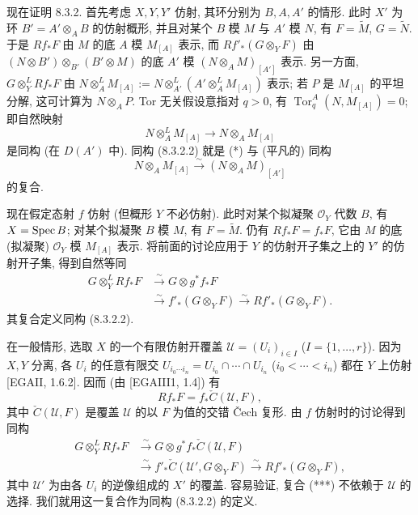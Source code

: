 现在证明 8.3.2. 首先考虑 $X,Y,Y'$ 仿射, 其环分别为 $B,A,A'$ 的情形. 此时 $X'$ 为环 $B'=A'\otimes_AB$ 的仿射概形, 并且对某个 $B$ 模 $M$ 与 $A'$ 模 $N$, 有 $F=\widetilde M$, $G=\widetilde N$. 于是 $Rf_*F$ 由 $M$ 的底 $A$ 模 $M_{[A]}$ 表示, 而 $Rf'_*(G\otimes_YF)$ 由 $(N\otimes B')\otimes_{B'}(B'\otimes M)$ 的底 $A'$ 模 $(N\otimes_AM)_{[A']}$ 表示. 另一方面, $G\otimes_Y^LRf_*F$ 由 $N\otimes_A^LM_{[A]}:=N\otimes_{A'}^L(A'\otimes_A^LM_{[A]})$ 表示; 若 $P$ 是 $M_{[A]}$ 的平坦分解, 这可计算为 $N\otimes_AP$. Tor 无关假设意指对 $q>0$, 有 $\operatorname{Tor}_q^A(N,M_{[A]})=0$; 即自然映射
\begin{equation}N\otimes_A^LM_{[A]}\longrightarrow N\otimes_AM_{[A]}\tag{*}\label{ch08:eq832star}\end{equation}
是同构 (在 $D(A')$ 中). 同构 (8.3.2.2) 就是 (*) 与 (平凡的) 同构
\begin{equation}N\otimes_AM_{[A]}\xrightarrow\sim(N\otimes_AM)_{[A']}\tag{**}\label{ch08:eq832star2}\end{equation}
的复合.

现在假定态射 $f$ 仿射 (但概形 $Y$ 不必仿射). 此时对某个拟凝聚 $\mathcal O_Y$ 代数 $B$, 有 $X=\operatorname{Spec} B$; 对某个拟凝聚 $B$ 模 $M$, 有 $F=\widetilde M$. 仍有 $Rf_*F=f_*F$, 它由 $M$ 的底 (拟凝聚) $\mathcal O_Y$ 模 $M_{[A]}$ 表示. 将前面的讨论应用于 $Y$ 的仿射开子集之上的 $Y'$ 的仿射开子集, 得到自然等同
\[\begin{aligned}
G\otimes_Y^LRf_*F&\xrightarrow\sim G\otimes g^*f_*F\\
&\xrightarrow\sim f'_*(G\otimes_YF)\xrightarrow\sim Rf'_*(G\otimes_YF).
\end{aligned}\]
其复合定义同构 (8.3.2.2).

在一般情形, 选取 $X$ 的一个有限仿射开覆盖 $\mathcal U=(U_i)_{i\in I}$ ($I=\{1,\ldots,r\}$). 因为 $X,Y$ 分离, 各 $U_i$ 的任意有限交 $U_{i_0\cdots i_n}=U_{i_0}\cap\cdots\cap U_{i_n}$ ($i_0<\cdots<i_n$) 都在 $Y$ 上仿射 [EGAII, 1.6.2]. 因而 (由 [EGAIII1, 1.4]) 有
\[Rf_*F=f_*\check C(\mathcal U,F),\]
其中 $\check C(\mathcal U,F)$ 是覆盖 $\mathcal U$ 的以 $F$ 为值的交错 Čech 复形. 由 $f$ 仿射时的讨论得到同构
\begin{equation}\begin{aligned}
G\otimes_Y^LRf_*F&\xrightarrow\sim G\otimes g^*f_*\check C(\mathcal U,F)\\
&\xrightarrow\sim f'_*\check C(\mathcal U',G\otimes_YF)\xrightarrow\sim Rf'_*(G\otimes_YF),
\end{aligned}\tag{***}\label{ch08:eq832star3}\end{equation}
其中 $\mathcal U'$ 为由各 $U_i$ 的逆像组成的 $X'$ 的覆盖. 容易验证, 复合 (***) 不依赖于 $\mathcal U$ 的选择. 我们就用这一复合作为同构 (8.3.2.2) 的定义.

